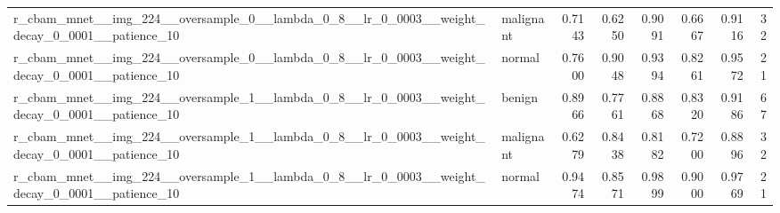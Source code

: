 \begin{longtable}{p{4.2cm}lrrrrrr}
r\_cbam\_mnet\_\_img\_224\_\_oversample\_0\_\_lambda\_0\_8\_\_lr\_0\_0003\_\_weight\_decay\_0\_0001\_\_patience\_10 & malignant & 0.7143 & 0.6250 & 0.9091 & 0.6667 & 0.9116 & 32 \\
r\_cbam\_mnet\_\_img\_224\_\_oversample\_0\_\_lambda\_0\_8\_\_lr\_0\_0003\_\_weight\_decay\_0\_0001\_\_patience\_10 & normal & 0.7600 & 0.9048 & 0.9394 & 0.8261 & 0.9572 & 21 \\
r\_cbam\_mnet\_\_img\_224\_\_oversample\_1\_\_lambda\_0\_8\_\_lr\_0\_0003\_\_weight\_decay\_0\_0001\_\_patience\_10 & benign & 0.8966 & 0.7761 & 0.8868 & 0.8320 & 0.9186 & 67 \\
r\_cbam\_mnet\_\_img\_224\_\_oversample\_1\_\_lambda\_0\_8\_\_lr\_0\_0003\_\_weight\_decay\_0\_0001\_\_patience\_10 & malignant & 0.6279 & 0.8438 & 0.8182 & 0.7200 & 0.8896 & 32 \\
r\_cbam\_mnet\_\_img\_224\_\_oversample\_1\_\_lambda\_0\_8\_\_lr\_0\_0003\_\_weight\_decay\_0\_0001\_\_patience\_10 & normal & 0.9474 & 0.8571 & 0.9899 & 0.9000 & 0.9769 & 21 \\
\bottomrule
\end{longtable}
\normalsize
